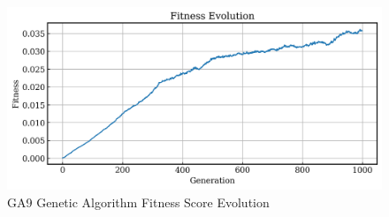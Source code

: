 \documentclass{article}
\begin{document}
\begin{figure}[H]
    \centering
    \includegraphics[width=0.75\linewidth]{figures/GAResults/GA9/fitness_curve.png}
    \caption{GA9 Genetic Algorithm Fitness Score Evolution}
    \label{fig:GA9_fitness}
\end{figure}



\end{document}
